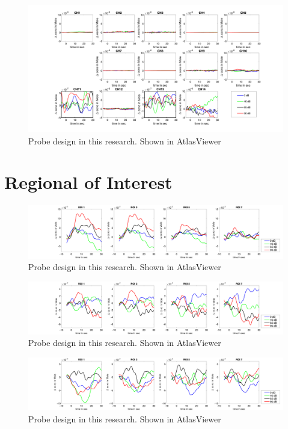 \begin{figure}[H]
  \centering
    \includegraphics[scale=.4]{bilder/HbO_Mole/sub_lin_s_HbO.png}
  \caption{Probe design in this research. Shown in AtlasViewer}
  \label{fig:somesignal}
\end{figure}

\newpage

\section {Regional of Interest}

\begin{figure}[H]
  \centering
    \includegraphics[scale=.3]{bilder/ROI/sub_jonas_s_HbO.png}
  \caption{Probe design in this research. Shown in AtlasViewer}
  \label{fig:somesignal}
\end{figure}

\begin{figure}[H]
  \centering
    \includegraphics[scale=.3]{bilder/ROI/sub_lukas_s_HbO.png}
  \caption{Probe design in this research. Shown in AtlasViewer}
  \label{fig:somesignal}
\end{figure}



\begin{figure}[H]
  \centering
    \includegraphics[scale=.3]{bilder/ROI/sub_luca2_s_HbO.png}
  \caption{Probe design in this research. Shown in AtlasViewer}
  \label{fig:somesignal}
\end{figure}


